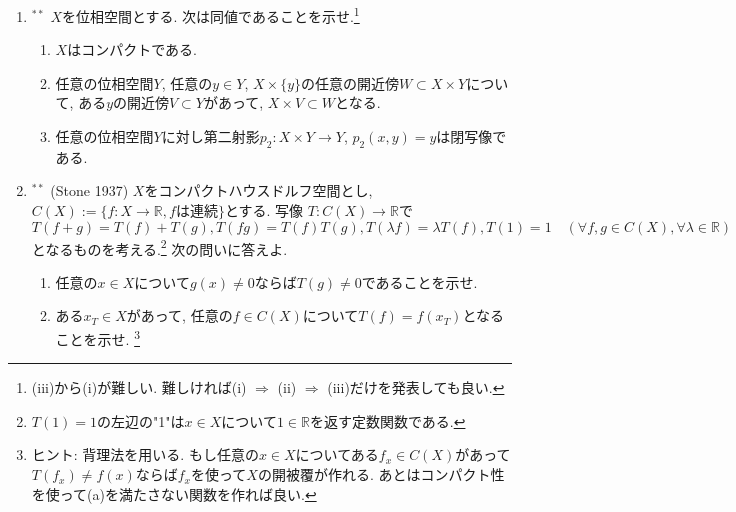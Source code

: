 \documentclass[dvipdfmx,a4paper,11pt]{article}
\newcommand{\R}{\mathbb{R}}
\theoremstyle{definition}
\begin{document}
\begin{enumerate}[label=\textbf{問}8.\arabic*]
\item $^{**}$ $X$を位相空間とする. 次は同値であることを示せ.\footnote{(iii)から(i)が難しい. 難しければ(i) $\Rightarrow$ (ii) $\Rightarrow$ (iii)だけを発表しても良い. }
\begin{enumerate}[label=(\roman*)]
 \setlength{\parskip}{0cm}
  \setlength{\itemsep}{2pt} 
\item  $X$はコンパクトである.
\item 任意の位相空間$Y$, 任意の$y \in Y$, $X \times \{ y\}$の任意の開近傍$W \subset X \times Y$について, ある$y$の開近傍$V \subset Y$があって, $X \times V \subset W$となる.
\item 任意の位相空間$Y$に対し第二射影$p_{2} : X \times Y \rightarrow Y$, $p_2(x,y)=y$は閉写像である. 
\end{enumerate}









\item \label{stone} $^{**}$ (Stone 1937) $X$をコンパクトハウスドルフ空間とし, $C(X):= \{ f : X \rightarrow \R, \text{$f$は連続}\}$とする. 写像
$T : C(X) \rightarrow \R$で
$$
T(f + g) = T(f) + T(g), T(fg)=T(f)T(g),  T(\lambda f) = \lambda T(f), T(1)=1 \quad (\forall f,g \in C(X), \forall \lambda \in \R)
$$
となるものを考える.\footnote{$T(1) = 1$の左辺の"1"は$x \in X$について$1 \in \R$を返す定数関数である. } 次の問いに答えよ.
\begin{enumerate}
 \setlength{\parskip}{0cm}
  \setlength{\itemsep}{2pt} 
\item 任意の$x \in X$について$g(x) \neq 0$ならば$T(g) \neq 0$であることを示せ. 
\item ある$x_{T} \in X$があって, 任意の$f \in C(X)$について$T(f) = f(x_{T})$となることを示せ. \footnote{ヒント: 背理法を用いる. もし任意の$x \in X$についてある$f_{x} \in C(X)$があって$T(f_x) \neq f(x)$ならば$f_x$を使って$X$の開被覆が作れる. あとはコンパクト性を使って(a)を満たさない関数を作れば良い.}
\end{enumerate}


\end{enumerate}
\end{document}
